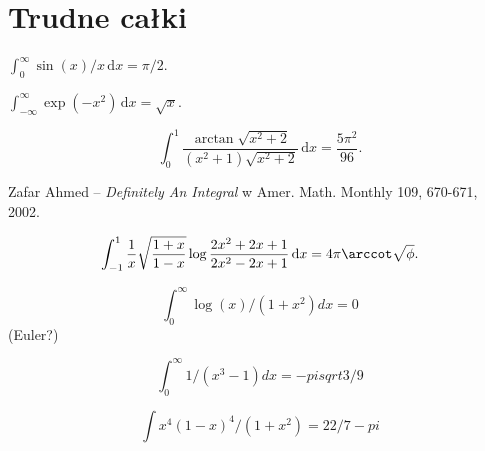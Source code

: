 \section{Trudne całki}

\begin{integral}
    $\int_0^\infty \sin(x) / x \,\mathrm{d}x = \pi/2$.
\end{integral}

\begin{integral}
    $\int_{-\infty}^\infty \exp(-x^2) \,\mathrm{d}x = \sqrt x$.
\end{integral}

\begin{integral}
    \begin{equation}
        \int_0^1 \frac{\arctan \sqrt{x^2+2}}{(x^2+1) \sqrt{x^2+2}} \,\mathrm{d}x = \frac{5\pi^2}{96}.
    \end{equation}
\end{integral}

\begin{solution}
    Zafar Ahmed -- \emph{Definitely An Integral} w Amer. Math. Monthly 109, 670-671, 2002.
\end{solution}

\begin{integral}
    \begin{equation}
        \int_{-1}^1 \frac{1}{x} \sqrt{\frac{1+x}{1-x}} \log \frac{2x^2+2x+1}{2x^2-2x+1} \,\mathrm{d}x = 4 \pi \arccot \sqrt{\phi}.
    \end{equation}
\end{integral}

$$\int_0^\infty \log(x) / (1+x^2) dx = 0$$ (Euler?)

$$\int_0^\infty 1/(x^3 - 1) dx = -pi sqrt 3 / 9$$

$$ \int x^4 (1-x)^4 / (1+x^2) = 22/7 - pi$$




